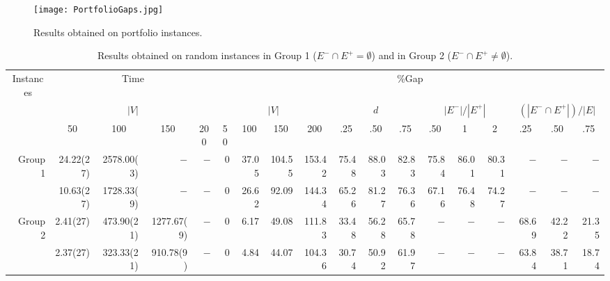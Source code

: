 \begin{figure}[Hp]
\hspace{-1cm}
\texttt{[image: PortfolioGaps.jpg]}
\caption{\footnotesize Results obtained on portfolio instances.}
\label{resEconomyGraspxDFSxBFS}
\end{figure}

\begin{sidewaystable}[Hp]
\footnotesize
\begin{center}
\begin{tabular}{r||rrrr||rrrr|rrr|rrr|rrr}
\hline
\multicolumn{1}{c||}{Instances} &
\multicolumn{4}{c||}{Time} &
\multicolumn{13}{c}{\%Gap} \\
\multicolumn{1}{c||}{} &
\multicolumn{4}{c||}{$|V|$} &
\multicolumn{4}{c|}{$|V|$} &
\multicolumn{3}{c|}{$d$} &
\multicolumn{3}{c|}{$|E^-|/|E^+|$} &
\multicolumn{3}{c}{$(|E^-\cap E^+|)/|E|$} \\
& \multicolumn{1}{c}{50}&
 \multicolumn{1}{c}{100}&
 \multicolumn{1}{c}{150}&
 \multicolumn{1}{c||}{200}&
 \multicolumn{1}{c}{50}&
 \multicolumn{1}{c}{100}&
 \multicolumn{1}{c}{150}&
 \multicolumn{1}{c|}{200}&
 \multicolumn{1}{c}{.25} &
 \multicolumn{1}{c}{.50} &
 \multicolumn{1}{c|}{.75} &
 \multicolumn{1}{c}{.50}  &
 \multicolumn{1}{c}{1}   &
 \multicolumn{1}{c|}{2}   &
 \multicolumn{1}{c}{.25} &
 \multicolumn{1}{c}{.50} &
 \multicolumn{1}{c}{.75} \\
\hline\hline
Group 1 &24.22(27)&2578.00(3)&  $-$     &  $-$  & 0	 & 37.05 & 104.55 &	153.42 & 75.48  & 88.03	& 82.83	& 75.84	& 86.01& 80.31&$-$&$-$&$-$\\	
        &10.63(27)&1728.33(9)&  $-$     &  $-$  & 0	 & 26.62 &	92.09 &	144.34 & 65.26  & 81.27 & 76.36 & 67.16 & 76.48& 74.27&$-$&$-$&$-$\\
\hline
Group 2 &2.41(27)&473.90(21)&1277.67(9)& $-$ & 0	 & 6.17	 &  49.08 &	111.83 & 33.48	& 56.28	& 65.78 &$-$&$-$&$-$& 68.69 & 42.22 & 21.35 \\
        &2.37(27)&323.33(21)&910.78(9)& $-$ & 0	 & 4.84  &	44.07 &	104.36 & 30.74  & 50.92 & 61.97 &$-$&$-$&$-$& 63.84 & 38.71 & 18.74 \\
\hline\hline
\end{tabular}
\end{center}
\caption{\footnotesize Results obtained on random instances in Group 1 ($E^-\cap E^+=\emptyset$) and in Group 2 ($E^-\cap E^+\neq\emptyset$).}
\label{resRandomInstBC}
\normalsize
\end{sidewaystable}

